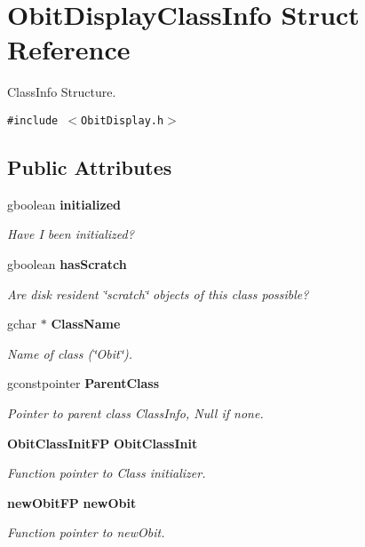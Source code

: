 \section{Obit\-Display\-Class\-Info Struct Reference}
\label{structObitDisplayClassInfo}
Class\-Info Structure.  


{\tt \#include $<$Obit\-Display.h$>$}

\subsection*{Public Attributes}
\begin{CompactItemize}
\item 
gboolean {\bf initialized}
\begin{CompactList}\small\item\em Have I been initialized? \item\end{CompactList}\item 
gboolean {\bf has\-Scratch}
\begin{CompactList}\small\item\em Are disk resident \char`\"{}scratch\char`\"{} objects of this class possible? \item\end{CompactList}\item 
gchar $\ast$ {\bf Class\-Name}
\begin{CompactList}\small\item\em Name of class (\char`\"{}Obit\char`\"{}). \item\end{CompactList}\item 
gconstpointer {\bf Parent\-Class}
\begin{CompactList}\small\item\em Pointer to parent class Class\-Info, Null if none. \item\end{CompactList}\item 
{\bf Obit\-Class\-Init\-FP} {\bf Obit\-Class\-Init}
\begin{CompactList}\small\item\em Function pointer to Class initializer. \item\end{CompactList}\item 
{\bf new\-Obit\-FP} {\bf new\-Obit}
\begin{CompactList}\small\item\em Function pointer to new\-Obit. \item\end{CompactList}\item 

\end{CompactItemize}
